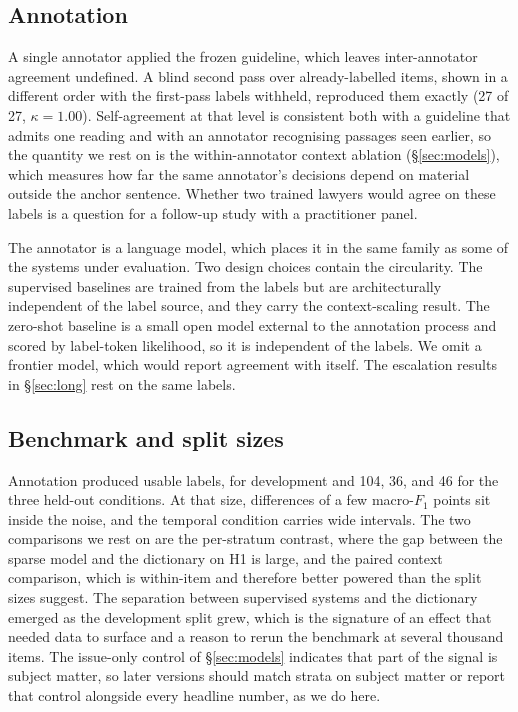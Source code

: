 \subsection*{Annotation} A single annotator applied the frozen guideline, which
leaves inter-annotator agreement undefined. A blind second pass over
already-labelled items, shown in a different order with the first-pass labels
withheld, reproduced them exactly (27 of 27, $\kappa=1.00$). Self-agreement at
that level is consistent both with a guideline that admits one reading and with
an annotator recognising passages seen earlier, so the quantity we rest on is the
within-annotator context ablation (\S\ref{sec:models}), which measures how far the
same annotator's decisions depend on material outside the anchor sentence.
Whether two trained lawyers would agree on these labels is a question for a
follow-up study with a practitioner panel.

The annotator is a language model, which places it in the same family as some of
the systems under evaluation. Two design choices contain the circularity. The
supervised baselines are trained from the labels but are architecturally
independent of the label source, and they carry the context-scaling result. The
zero-shot baseline is a small open model external to the annotation process and
scored by label-token likelihood, so it is independent of the labels. We omit a
frontier model, which would report agreement with itself. The escalation results
in \S\ref{sec:long} rest on the same labels.

\subsection*{Benchmark and split sizes} Annotation produced \NBench{} usable labels,
\NDev{} for development and 104, 36, and 46 for the three held-out conditions. At
that size, differences of a few macro-$F_1$ points sit inside the noise, and the
temporal condition carries wide intervals. The two comparisons we rest on are the
per-stratum contrast, where the gap between the sparse model and the dictionary
on H1 is large, and the paired context comparison, which is within-item and
therefore better powered than the split sizes suggest. The separation between
supervised systems and the dictionary emerged as the development split grew,
which is the signature of an effect that needed data to surface and a reason to
rerun the benchmark at several thousand items. The issue-only control of
\S\ref{sec:models} indicates that part of the signal is subject matter, so later
versions should match strata on subject matter or report that control alongside
every headline number, as we do here.

